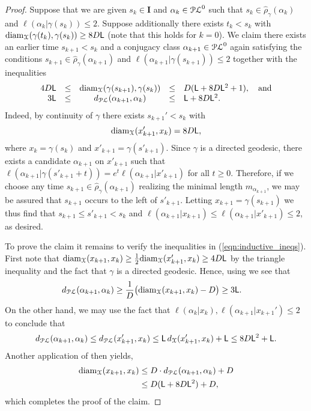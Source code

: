 \documentclass[letterpaper,fleqn]{article}
\theoremstyle{plain}
\theoremstyle{definition}
\DeclareMathOperator{\diam}{diam}
\newcommand{\pl}{{\EuScript{PL}}} %
\newcommand{\os}{{\EuScript X}} %
\newcommand{\X}{\os}
\newcommand{\plproj}{\pi_\pl} %
\newcommand{\len}{\ell}  %
\newcommand{\minlen}{m}  %
\newcommand{\minpts}{\rho} %
\newcommand{\mintime}{\hat{\minpts}} %
\newcommand{\lipconst}{{\sf L}} %
\renewcommand{\diam}{\mathrm{diam}}
\newcommand{\I}{\mathbf{I}}
\begin{document}
\begin{proof}
Suppose that we are given $s_k\in\I$ and $\alpha_k\in \pl^0$ such that $s_k\in \mintime_\gamma(\alpha_k)$ and $\len(\alpha_k\vert\gamma(s_k))\le 2$. Suppose additionally there exists $t_k < s_k$ with $\diam_\os(\gamma(t_k),\gamma(s_k)) \ge 8D\lipconst$ (note that this holds for $k=0$). We claim there exists an earlier time $s_{k+1} < s_k$ and a conjugacy class $\alpha_{k+1}\in \pl^0$ again satisfying the conditions $s_{k+1}\in \mintime_\gamma(\alpha_{k+1})$ and $\len(\alpha_{k+1}\vert\gamma(s_{k+1})) \le 2$ together with the inequalities
\begin{align}\label{eqn:inductive_ineqs}
\begin{array}{rrcll}
4D\lipconst & \le &  \diam_\os(\gamma(s_{k+1}),\gamma(s_k)) & \le & D(\lipconst + 8D\lipconst^2 + 1), \quad\text{and}\\
3\lipconst  & \le & d_\pl(\alpha_{k+1},\alpha_k)            & \le & \lipconst + 8D\lipconst^2.\end{array}
\end{align}
Indeed, by continuity of $\gamma$ there exists $s_{k+1}' < s_k$ with
\[\diam_\os(x'_{k+1}, x_k) =  8D\lipconst,\]
where $x_k = \gamma(s_k)$ and $x'_{k+1} = \gamma(s'_{k+1})$. Since $\gamma$ is a directed geodesic, there exists a candidate $\alpha_{k+1}$ on $x'_{k+1}$ such that $\len(\alpha_{k+1}\vert \gamma(s'_{k+1} + t)) = e^t\len(\alpha_{k+1}\vert x'_{k+1})$ for all $t \ge 0$. Therefore, if we choose any time $s_{k+1}\in \mintime_\gamma(\alpha_{k+1})$ realizing the minimal length $\minlen_{\alpha_{k+1}}$, we may be assured that $s_{k+1}$ occurs to the left of $s'_{k+1}$. Letting $x_{k+1} = \gamma(s_{k+1})$ we thus find that $s_{k+1} \le s'_{k+1} < s_k$ and $\len(\alpha_{k+1}\vert x_{k+1}) \le \len(\alpha_{k+1}\vert x'_{k+1})\le 2$, as desired.

To prove the claim it remains to verify the inequalities in (\ref{eqn:inductive_ineqs}). First note that $\diam_\os(x_{k+1},x_k)\ge \tfrac{1}{2}\diam_\os(x'_{k+1},x_k) \ge 4D\lipconst$ by the triangle inequality and the fact that $\gamma$ is a directed geodesic. 
Hence, using  we see that 
\begin{align*}
d_{\pl}(\alpha_{k+1},\alpha_k) &\ge \frac{1}{D}\big( \diam_\X(x_{k+1},x_k) -D\big)  \ge 3\lipconst.
\end{align*}
On the other hand, we may use the fact that $\ell(\alpha_k\vert x_k), \ell(\alpha_{k+1}|x_{k+1}' )\le 2$ to conclude that 
\begin{align*}
d_\pl(\alpha_{k+1},\alpha_k) \le d_\pl(x'_{k+1},x_k) \le \lipconst\,d_\os(x'_{k+1},x_k) + \lipconst \le 8D\lipconst^2 + \lipconst.
\end{align*}
Another application of  then yields,
\begin{align*}
\diam_\X(x_{k+1}, x_k) &\le D \cdot d_{\pl}(\alpha_{k+1},\alpha_k) +D \\
&\le D(\lipconst+8D\lipconst^2)+D,
\end{align*}
which completes the proof of the claim.


\end{proof}
\end{document}
